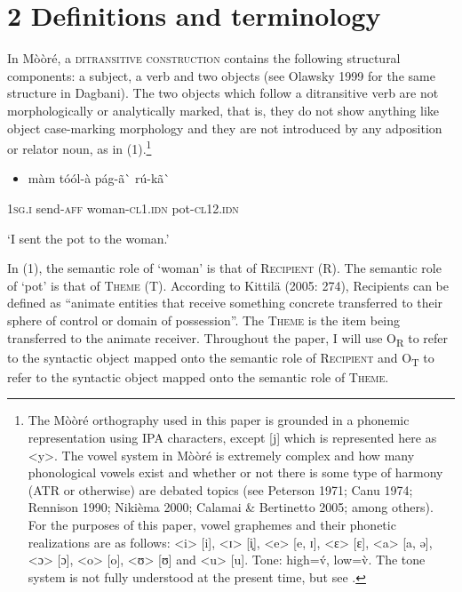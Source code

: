 \documentclass[output=paper]{langsci/langscibook}
\begin{document}
\chapter{2 Definitions and terminology}

In M\`{o}\`{o}r\'{e}, a \textsc{ditransitive construction} contains the following structural components: a subject, a verb and two objects (see Olawsky 1999 for the same structure in Dagbani). The two objects which follow a ditransitive verb are not morphologically or analytically marked, that is, they do not show anything like object case-marking morphology and they are not introduced by any adposition or relator noun, as in (1).\footnote{ {The M\`{o}\`{o}r\'{e} orthography used in this paper is grounded in a phonemic representation using IPA characters, except [j] which is represented here as {\textless}y{\textgreater}. The vowel system in M\`{o}\`{o}r\'{e} is extremely complex and how many phonological vowels exist and whether or not there is some type of harmony (ATR or otherwise) are debated topics (see Peterson 1971; Canu 1974; Rennison 1990; Niki\`{e}ma 2000; Calamai \& Bertinetto 2005; among others). For the purposes of this paper, vowel graphemes and their phonetic realizations are as follows: {\textless}i{\textgreater} [i], {\textless}ɪ{\textgreater} [i̙], {\textless}e{\textgreater} [e, ɪ], {\textless}ɛ{\textgreater} [ɛ], {\textless}a{\textgreater} [a, ə], {\textless}ɔ{\textgreater} [ɔ], {\textless}o{\textgreater} [o], {\textless}ʊ{\textgreater} [ʊ] and {\textless}u{\textgreater} [u]. Tone: high=\'{v}, low=\`{v}. The tone system is not fully understood at the present time, but see \citet{Peterson1971}.} }

\begin{itemize}
\item \begin{styleNumberedEX}
\label{bkm:Ref424141523}m\`{a}m    t\'{o}\'{o}l-\`{a}        p\'{a}g-\~{a}\`{ }             r\'{u}-k\~{a}\`{ }
\end{styleNumberedEX}\end{itemize}
\begin{styleGloss}
\textsc{1sg.i}    send-\textsc{aff}      woman-\textsc{cl1.idn}       pot-\textsc{cl12.idn}
\end{styleGloss}

\begin{styleTranslation}
‘I sent the pot to the woman.’  
\end{styleTranslation}

In (1), the semantic role of ‘woman’ is that of \textsc{Recipient} (R).  The semantic role of ‘pot’ is that of \textsc{Theme} (T). According to Kittilä (2005: 274), Recipients can be defined as “animate entities that receive something concrete transferred to their sphere of control or domain of possession”. The \textsc{Theme} is the item being transferred to the animate receiver. Throughout the paper, I will use O\textsubscript{R} to refer to the syntactic object mapped onto the semantic role of \textsc{Recipient} and O\textsubscript{T }to refer to the syntactic object mapped onto the semantic role of \textsc{Theme}. 
\end{document}
